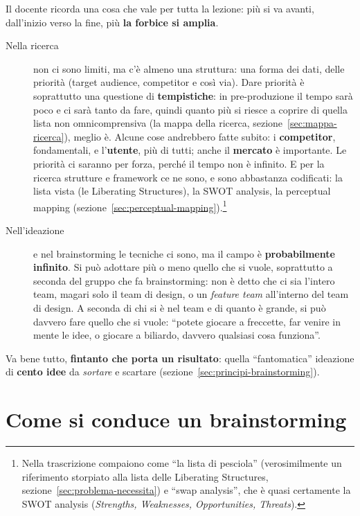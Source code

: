Il docente ricorda una cosa che vale per tutta la lezione: più si va avanti,
dall'inizio verso la fine, più \textbf{la forbice si amplia}.
\begin{description}
  \item[Nella ricerca] non ci sono limiti, ma c'è almeno una struttura: una
        forma dei dati, delle priorità (target audience, competitor e così
        via). Dare priorità è soprattutto una questione di
        \textbf{tempistiche}: in pre-produzione il tempo sarà poco e ci sarà
        tanto da fare, quindi quanto più si riesce a coprire di quella lista
        non omnicomprensiva (la mappa della ricerca,
        sezione~\ref{sec:mappa-ricerca}), meglio è. Alcune cose andrebbero
        fatte subito: i \textbf{competitor}, fondamentali, e
        l'\textbf{utente}, più di tutti; anche il \textbf{mercato} è
        importante. Le priorità ci saranno per forza, perché il tempo non è
        infinito. E per la ricerca strutture e framework ce ne sono, e sono
        abbastanza codificati: la lista vista (le Liberating Structures),
        la SWOT analysis, la perceptual mapping
        (sezione~\ref{sec:perceptual-mapping}).\footnote{Nella trascrizione
        compaiono come ``la lista di pesciola'' (verosimilmente un
        riferimento storpiato alla lista delle Liberating Structures,
        sezione~\ref{sec:problema-necessita}) e ``swap analysis'', che è
        quasi certamente la SWOT analysis (\emph{Strengths, Weaknesses,
        Opportunities, Threats}).}
  \item[Nell'ideazione] e nel brainstorming le tecniche ci sono, ma il campo
        è \textbf{probabilmente infinito}. Si può adottare più o meno
        quello che si vuole, soprattutto a seconda del gruppo che fa
        brainstorming: non è detto che ci sia l'intero team, magari solo il
        team di design, o un \emph{feature team} all'interno del team di
        design. A seconda di chi si è nel team e di quanto è grande, si può
        davvero fare quello che si vuole: ``potete giocare a freccette,
        far venire in mente le idee, o giocare a biliardo, davvero
        qualsiasi cosa funziona''.
\end{description}
Va bene tutto, \textbf{fintanto che porta un risultato}: quella
``fantomatica'' ideazione di \textbf{cento idee} da \emph{sortare} e scartare
(sezione~\ref{sec:principi-brainstorming}).

\section{Come si conduce un brainstorming}
\label{sec:condurre-brainstorming}

